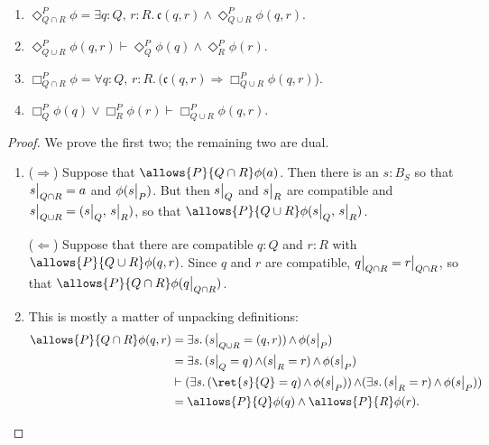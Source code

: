 \begin{prop}
~
\begin{enumerate}
    \item $\Diamond^P_{Q \cap R}\phi = \exists q : Q,\, r : R.\, \mathfrak{c}(q,r) \wedge \Diamond^P_{Q \cup R}\phi(q, r)$.
    \item $\Diamond^P_{Q \cup R} \phi(q, r) \vdash \Diamond^P_Q \phi(q) \wedge \Diamond^P_R \phi(r)$.
    \item $\Box^P_{Q \cap R}\phi = \forall q : Q,\, r : R.\, (\mathfrak{c}(q,r) \Rightarrow \Box^P_{Q \cup R}\phi(q, r)$).
    \item $\Box^P_Q \phi(q) \vee \Box^P_R \phi(r)  \vdash  \Box^P_{Q \cup R} \phi(q, r)$.
\end{enumerate}
\end{prop}
\begin{proof}
We prove the first two; the remaining two are dual.
\begin{enumerate}
    \item ($\Rightarrow$) Suppose that $\allows{P}{Q \cap R}\phi(a)$. Then there is an $s : B_S$ so that $s\big|_{Q \cap R} = a$ and $\phi(s\big|_{P})$. But then $s\big|_{Q}$ and $s\big|_{R}$ are compatible and $s\big|_{Q \cup R} = (s\big|_{Q},\, s\big|_{R})$, so that $\allows{P}{Q \cup R}\phi(\rest{s}{Q},\, \rest{s}{R})$.
    
    ($\Leftarrow$) Suppose that there are compatible $q : Q$ and $r : R$ with $\allows{P}{Q \cup R}\phi(q, r)$. Since $q$ and $r$ are compatible, $q\big|_{Q \cap R} = r\big|_{Q \cap R}$, so that $\allows{P}{Q \cap R}\phi(\rest{q}{Q \cap R})$.
    \item This is mostly a matter of unpacking definitions:
        \begin{align*}
            \allows{P}{Q \cap R}\phi(q, r) &= \exists s.\, (\rest{s}{Q \cup R} = (q, r)) \meet \phi(\rest{s}{P}) \\
                &= \exists s.\, (\rest{s}{Q} = q) \meet (\rest{s}{R} = r) \meet \phi(\rest{s}{P}) \\
                &\vdash (\exists s.\, (\ret{s}{Q} = q) \meet \phi(\rest{s}{P})) \meet (\exists s.\, (\rest{s}{R} = r) \meet \phi(\rest{s}{P})) \\
                &= \allows{P}{Q}\phi(q) \wedge \allows{P}{R}\phi(r). \qedhere
        \end{align*} 
\end{enumerate}
\end{proof}

